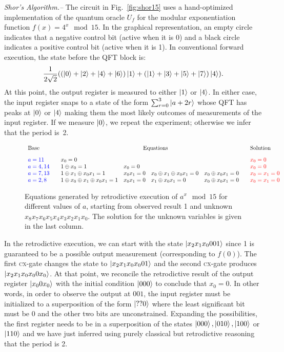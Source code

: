 \documentclass[aps,prl,twocolumn,superscriptaddress,floatfix,notitlepage]{revtex4-2}
\newcommand{\cx}{\textsc{cx}}
\newcommand{\red}[1]{{\color{red}{#1}}}
\newcommand{\blue}[1]{{\color{blue}{#1}}}
\begin{document}
{\it Shor's Algorithm.--}
The circuit in Fig.~\ref{fig:shor15} uses a hand-optimized
implementation of the quantum oracle $U_f$ for the modular exponentiation
function $f(x) = 4^x \mod{15}$. In the graphical representation, an empty circle 
indicates that a negative control bit (active when it is 0) 
and a black circle indicates a positive control bit (active when it is 1). In conventional
forward execution, the state before the QFT block is:
\[
\frac{1}{2\sqrt{2}} (
  (\ket{0} + \ket{2} + \ket{4} + \ket{6}) \ket{1} + 
  (\ket{1} + \ket{3} + \ket{5} + \ket{7}) \ket{4}
  ) .
\]
At this point, the output register is measured to either $\ket{1}$ or
$\ket{4}$. In either case, the input register snaps to a state
of the form $\sum_{r=0}^3 \ket{a+2r}$ whose QFT has peaks at $\ket{0}$
or $\ket{4}$ making them the most likely outcomes of measurements of
the input register. If we measure $\ket{0}$, we repeat the
experiment; otherwise we infer that the period is~2.


\begin{figure}[t]
\[\begin{array}{l@{\qquad}llll@{\qquad}l}
\textrm{Base} & \multicolumn{4}{c}{\textrm{Equations}} & \textrm{Solution} \\[2ex]
\blue{a=11} & x_0 = 0 &&&& \red{x_0 = 0} \\
\blue{a=4,14} & 1 \oplus x_0 = 1 & x_0 = 0 &&
  & \red{x_0 = 0} \\
\blue{a=7,13} & 1 \oplus x_1 \oplus x_0x_1 = 1 & x_0x_1 = 0 & x_0 \oplus x_1 \oplus x_0x_1 = 0 &  x_0 \oplus x_0x_1 = 0 & \red{x_0=x_1=0} \\
\blue{a=2,8} & 1 \oplus x_0 \oplus x_1 \oplus x_0x_1 = 1 & x_0x_1 = 0 & x_1 \oplus x_0x_1 = 0 & x_0 \oplus x_0x_1 = 0  & \red{x_0=x_1=0} 
\end{array}\]
\caption{Equations generated by retrodictive
  execution of $a^x \mod{15}$ for different values of $a$, starting
  from observed result 1 and unknown
  $x_8x_7x_6x_5x_4x_3x_2x_1x_0$. The solution for the unknown
  variables is given in the last column.}
  \label{fig:shor-eqs}
\end{figure}

In the retrodictive execution, we can start with the state
$\ket{x_2x_1x_0001}$ since 1 is guaranteed to be a possible output
measurement (corresponding to $f(0)$). The first \cx-gate changes the
state to $\ket{x_2x_1x_0x_001}$ and the second \cx-gate produces
$\ket{x_2x_1x_0x_00x_0}$. At that point, we reconcile the retrodictive
result of the output register $\ket{x_00x_0}$ with the initial
condition $\ket{000}$ to conclude that $x_0=0$. In other words, in
order to observe the output at $001$, the input register must
be initialized to a superposition of the form $\ket{??0}$ where the
least significant bit must be 0 and the other two bits are
unconstrained. Expanding the possibilities, the first register needs
to be in a superposition of the states $\ket{000}, \ket{010},
\ket{100}$ or $\ket{110}$ and we have just inferred using purely
classical but retrodictive reasoning that the period is
2.
\end{document}
